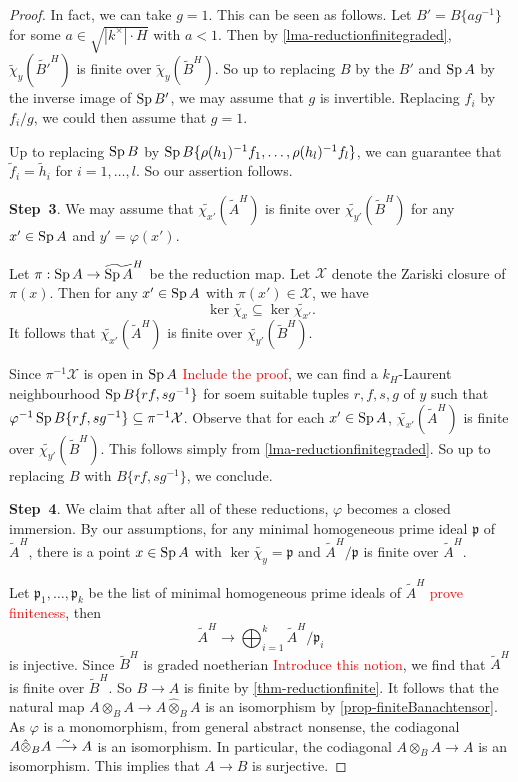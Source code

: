 \begin{proof}
    In fact, we can take $g=1$. This can be seen as follows.
    Let $B'=B\{ag^{-1}\}$ for some $a\in \sqrt{|k^{\times}|\cdot H}$ with $a<1$. Then by \cref{lma-reductionfinitegraded}, $\tilde{\chi}_y(\tilde{B'}^H)$ is finite over $\tilde{\chi}_y(\tilde{B}^H)$. So up to replacing $B$ by the $B'$ and $\operatorname{Sp} A$ by the inverse image of $\operatorname{Sp} B'$, we may assume that $g$ is invertible. Replacing $f_i$ by $f_i/g$, we could then assume  that $g=1$. 
    
    Up to replacing $\operatorname{Sp} B$ by $\operatorname{Sp} B\{\rho(h_1)^{-1}f_1,\ldots,\rho(h_l)^{-1}f_l\}$, we can guarantee that $\tilde{f}_i=\tilde{h}_i$ for $i=1,\ldots,l$. So our assertion follows.

    \textbf{Step~3}. We may assume that $\widetilde{\chi_{x'}}(\tilde{A}^H)$ is finite over $\widetilde{\chi_{y'}}(\tilde{B}^H)$ for any $x'\in \operatorname{Sp} A$ and $y'=\varphi(x')$.
    
    Let $\pi:\operatorname{Sp} A\rightarrow \widetilde{\operatorname{Sp} A}^H$ be the reduction map. Let $\mathcal{X}$ denote the Zariski closure of $\pi(x)$. Then for any $x'\in \operatorname{Sp} A$ with $\pi(x')\in \mathcal{X}$, we have 
    \[
        \ker \widetilde{\chi_x}\subseteq \ker \widetilde{\chi_{x'}}. 
    \]
    It follows that $\widetilde{\chi_{x'}}(\tilde{A}^H)$ is finite over $\widetilde{\chi_{y'}}(\tilde{B}^H)$. 

    Since $\pi^{-1}\mathcal{X}$ is open in $\operatorname{Sp} A$ \textcolor{red}{Include the proof}, we can find a $k_H$-Laurent neighbourhood $\operatorname{Sp} B\{rf,sg^{-1} \}$ for soem suitable tuples $r,f,s,g$ of $y$ such that $\varphi^{-1}\operatorname{Sp} B\{rf,sg^{-1} \}\subseteq \pi^{-1}\mathcal{X}$. Observe that for each $x'\in \operatorname{Sp} A$, $\widetilde{\chi_{x'}}(\tilde{A}^H)$ is finite over  $\widetilde{\chi_{y'}}(\tilde{B}^H)$. This follows simply from \cref{lma-reductionfinitegraded}. So up to replacing $B$ with $B\{rf,sg^{-1} \}$, we conclude.

    \textbf{Step~4}. We claim that after all of these reductions, $\varphi$ becomes a closed immersion. By our assumptions, for any minimal homogeneous prime ideal $\mathfrak{p}$ of $\tilde{A}^H$, there is a point $x\in \operatorname{Sp} A$ with $\ker \widetilde{\chi_y}=\mathfrak{p}$ and $\tilde{A}^H/\mathfrak{p}$ is finite over $\tilde{A}^H$.

    Let $\mathfrak{p}_1,\ldots,\mathfrak{p}_k$ be the list of minimal homogeneous prime ideals of $\tilde{A}^H$ \textcolor{red}{prove finiteness}, then
    \[
        \tilde{A}^H\rightarrow \bigoplus_{i=1}^k \tilde{A}^H/\mathfrak{p}_i  
    \]
    is injective. Since $\tilde{B}^H$ is graded noetherian \textcolor{red}{Introduce this notion}, we find that $\tilde{A}^H$ is finite over $\tilde{B}^H$. So $B\rightarrow A$ is finite by \cref{thm-reductionfinite}. It follows that the natural map $A\otimes_B A\rightarrow A\hat{\otimes}_B A$ is an isomorphism by \cref{prop-finiteBanachtensor}. As $\varphi$ is a monomorphism, from general abstract nonsense, the codiagonal $A\hat{\otimes}_B A\stackrel{\sim}{\longrightarrow} A$ is an isomorphism. In particular, the codiagonal $A\otimes_B A\rightarrow A$ is an isomorphism. This implies that $A\rightarrow B$ is surjective.
\end{proof}

